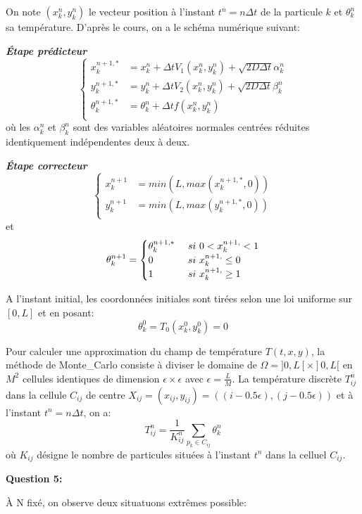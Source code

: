 \documentclass[
  11pt,
  dvipsnames]{article}
\begin{document}
On note \((x_k^n,y_k^n)\) le vecteur position à l'instant \(t^n = n\Delta t\) de la particule \(k\) et \(\theta_k^n\) sa température. D'après le cours, on a le schéma numérique suivant:

\textbf{\emph{Étape prédicteur}}
\[\begin{cases}
x_k^{n+1,*}&=x_k^n + \Delta t V_1(x_k^n,y_k^n)+\sqrt{2D\Delta t}\alpha_k^n\\
y_k^{n+1,*}&=y_k^n + \Delta t V_2(x_k^n,y_k^n)+\sqrt{2D\Delta t}\beta_k^n\\
\theta_k^{n+1,*}&=\theta_k^n +\Delta t f(x_k^n,y_k^n)\\
\end{cases}\]
où les \(\alpha_k^n\) et \(\beta_k^n\) sont des variables aléatoires normales centrées réduites identiquement indépendentes deux à deux.

\textbf{\emph{Étape correcteur}}
\[\begin{cases}
x_k^{n+1}&=min(L,max(x_k^{n+1,*},0))\\
y_k^{n+1}&=min(L,max(y_k^{n+1,*},0))\\
\end{cases}\]
et
\[\theta_k^{n+1}=\begin{cases}
\theta_k^{n+1,*} \ &si \ 0 < x_k^{n+1,\*} < 1\\
0 \ &si \ x_k^{n+1,\*} \leq 0\\
1 \ &si \ x_k^{n+1,\*} \geq 1\\
\end{cases}\]

A l'instant initial, les coordonnées initiales sont tirées selon une loi uniforme sur \([0,L]\) et en posant:
\[\theta_k^0 =T_0(x_k^0,y_k^0)=0\]

Pour calculer une approximation du champ de température \(T(t,x,y)\), la méthode de Monte\_Carlo consiste à diviser le domaine de \(\Omega = ]0,L[ \times ]0,L[\) en \(M^2\) cellules identiques de dimension \(\epsilon \times \epsilon\) avec \(\epsilon = \frac{L}{M}\). La température discrète \(T_{ij}^n\) dans la cellule \(C_{ij}\) de centre \(X_{ij}=(x_{ij},y_{ij})=((i-0.5\epsilon),(j-0.5\epsilon))\) et à l'instant \(t^n = n \Delta t\), on a:
\[T_{ij}^n=\frac{1}{K_{ij}^n}\sum_{p_k \in C_{ij}} \theta_k^n\]
où \(K_{ij}\) désigne le nombre de particules situées à l'instant \(t^n\) dans la celluel \(C_{ij}\).

\textbf{Question 5:}

À N fixé, on observe deux situatuons extrêmes possible:
\end{document}
